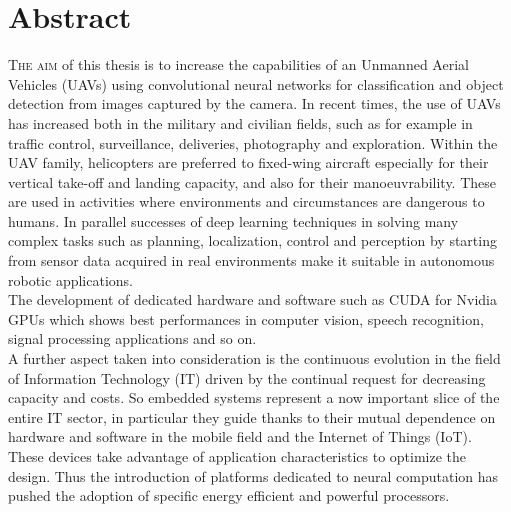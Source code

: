 \chapter*{Abstract}
\label{chap:abstract}
%
%
\lettrine[lines=3]{T}{he aim} of this thesis is to increase the capabilities of
an Unmanned Aerial Vehicles (UAVs) using convolutional neural networks for
classification and object detection from images captured by the camera.
In recent times, the use of UAVs has increased both in the military and civilian
fields, such as for example in traffic control, surveillance, deliveries,
photography and exploration.
Within the UAV family, helicopters are preferred to fixed-wing aircraft
especially for their vertical take-off and landing capacity, and also for their
manoeuvrability.
These are used in activities where environments and circumstances are dangerous
to humans.
In parallel successes of deep learning techniques in solving many complex tasks
such as planning, localization, control and perception by starting from sensor
data acquired in real environments make it suitable in autonomous robotic
applications.\\
The development of dedicated hardware and software such as CUDA for Nvidia GPUs
which shows best performances in computer vision, speech recognition,
signal processing applications and so on.\\
A further aspect taken into consideration is the continuous evolution in the
field of Information Technology (IT) driven by the continual request for
decreasing capacity and costs.
So embedded systems represent a now important slice of the entire IT sector, in
particular they guide thanks to their mutual dependence on hardware and software
in the mobile field and the Internet of Things (IoT).\\
These devices take advantage of application characteristics to optimize the
design. Thus the introduction of platforms dedicated to neural computation has
pushed the adoption of specific energy efficient and powerful processors.\\

